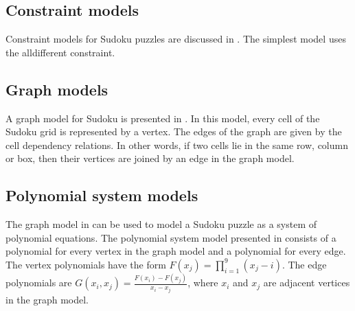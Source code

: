 \subsection{Constraint models}
\label{sec:models:constraints}

Constraint models for Sudoku puzzles are discussed in \cite{simonissudoku}. The simplest model uses the alldifferent constraint.

\subsection{Graph models}
\label{sec:models:graph}

A graph model for Sudoku is presented in \cite{gagovargaset}. In this model, every cell of the Sudoku grid is represented by a vertex. The edges of the graph are given by the cell dependency relations. In other words, if two cells lie in the same row, column or box, then their vertices are joined by an edge in the graph model.

\subsection{Polynomial system models}
\label{sec:models:polynomials}

The graph model in \cite{gagovargaset} can be used to model a Sudoku puzzle as a system of polynomial equations. The polynomial system model presented in \cite{gagovargaset} consists of a polynomial for every vertex in the graph model and a polynomial for every edge. The vertex polynomials have the form $F(x_j) = \prod_{i=1}^{9} (x_j - i)$. The edge polynomials are $G(x_i, x_j) = \frac{F(x_i) - F(x_j)}{x_i - x_j}$, where $x_i$ and $x_j$ are adjacent vertices in the graph model. 

